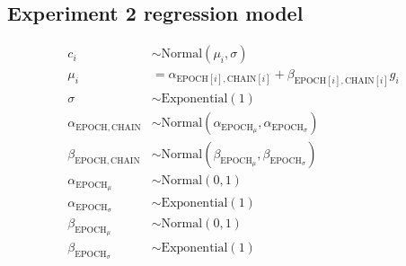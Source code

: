 \documentclass[doc,biblatex]{apa7}
\begin{document}
\subsection{Experiment 2 regression model}

	\begin{equation}
	\begin{aligned}
	   c_i                                 & \sim \mathrm{Normal}(\mu_i, \sigma) \\
	 \mu_i                                 & = \alpha_{\mathrm{EPOCH}[i],\mathrm{CHAIN}[i]} + \beta_{\mathrm{EPOCH}[i],\mathrm{CHAIN}[i]} g_i \\
	\sigma                                 & \sim \mathrm{Exponential}(1) \\
	\alpha_{\mathrm{EPOCH},\mathrm{CHAIN}} & \sim \mathrm{Normal}(\alpha_{\mathrm{EPOCH}_\mu}, \alpha_{\mathrm{EPOCH}_\sigma}) \\
	\beta_{\mathrm{EPOCH},\mathrm{CHAIN}}  & \sim \mathrm{Normal}(\beta_{\mathrm{EPOCH}_\mu}, \beta_{\mathrm{EPOCH}_\sigma}) \\
	\alpha_{\mathrm{EPOCH}_\mu}            & \sim \mathrm{Normal}(0, 1) \\
	\alpha_{\mathrm{EPOCH}_\sigma}         & \sim \mathrm{Exponential}(1) \\
	\beta_{\mathrm{EPOCH}_\mu}             & \sim \mathrm{Normal}(0, 1) \\
	\beta_{\mathrm{EPOCH}_\sigma}          & \sim \mathrm{Exponential}(1)
	\end{aligned}
	\end{equation}
\end{document}
